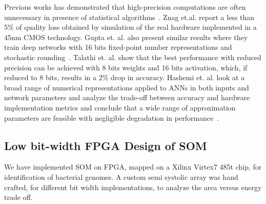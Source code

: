 \documentclass[a4paper,10pt]{article}
\begin{document}


Previous works has demonstrated that high-precision computations are often unnecessary in presence of statistical algorithms~\cite{Moons2017,Zhang2015}. Znag et.al. report a less than 5\% of quality loss  obtained by simulation of the real hardware implemented in a 45nm CMOS technology. Gupta et. al. also present similar results where they train deep networks with 16 bits fixed-point number representations and stochastic rounding~\cite{Gupta2015}. Talathi et. al. show that  the best performance with reduced precision  can be  achieved with 8 bits weights and 16 bits activation, which, if reduced to 8 bits, results in  a 2\% drop in accuracy. Hashemi et. al. look at a broad range of numerical representations applied to ANNs in both inputs and network parameters and analyze the trade-off between accuracy and hardware implementation metrics and conclude that a wide range of approximation parameters are feasible with negligible degradation in performance~\cite{Hashemi2017}.

\subsection{Low bit-width FPGA Design of SOM}
We have implemented SOM on FPGA, mapped on a Xilinx Virtex7 485t chip, for identification of bacterial genomes. A custom semi systolic array was hand crafted, for different bit width implementations, to analyze the area versus energy trade off.
\end{document}
